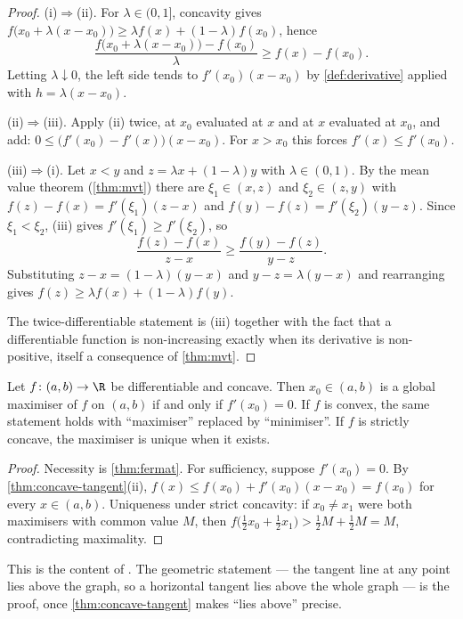 \begin{proof}
	(i)$\Rightarrow$(ii). For $\lambda\in(0,1]$, concavity gives
	$f\bigl(x_0+\lambda(x-x_0)\bigr)\geq\lambda f(x)+(1-\lambda)f(x_0)$, hence
	\[
		\frac{f\bigl(x_0+\lambda(x-x_0)\bigr)-f(x_0)}{\lambda}\geq f(x)-f(x_0).
	\]
	Letting $\lambda\downarrow0$, the left side tends to $f'(x_0)(x-x_0)$ by
	\autoref{def:derivative} applied with $h=\lambda(x-x_0)$.

	(ii)$\Rightarrow$(iii). Apply (ii) twice, at $x_0$ evaluated at $x$ and at $x$
	evaluated at $x_0$, and add:
	$0\leq\bigl(f'(x_0)-f'(x)\bigr)(x-x_0)$. For $x>x_0$ this forces
	$f'(x)\leq f'(x_0)$.

	(iii)$\Rightarrow$(i). Let $x<y$ and $z=\lambda x+(1-\lambda)y$ with
	$\lambda\in(0,1)$. By the mean value theorem (\autoref{thm:mvt}) there are
	$\xi_1\in(x,z)$ and $\xi_2\in(z,y)$ with
	$f(z)-f(x)=f'(\xi_1)(z-x)$ and $f(y)-f(z)=f'(\xi_2)(y-z)$. Since
	$\xi_1<\xi_2$, (iii) gives $f'(\xi_1)\geq f'(\xi_2)$, so
	\[
		\frac{f(z)-f(x)}{z-x}\geq\frac{f(y)-f(z)}{y-z} .
	\]
	Substituting $z-x=(1-\lambda)(y-x)$ and $y-z=\lambda(y-x)$ and rearranging gives
	$f(z)\geq\lambda f(x)+(1-\lambda)f(y)$.

	The twice-differentiable statement is (iii) together with the fact that a
	differentiable function is non-increasing exactly when its derivative is
	non-positive, itself a consequence of \autoref{thm:mvt}.
\end{proof}

\begin{theorem}
	\label{thm:foc-concave}
	Let $f\colon(a,b)\to\R$ be differentiable and concave. Then $x_0\in(a,b)$ is a
	global maximiser of $f$ on $(a,b)$ if and only if $f'(x_0)=0$. If $f$ is
	convex, the same statement holds with ``maximiser'' replaced by ``minimiser''.
	If $f$ is strictly concave, the maximiser is unique when it exists.
\end{theorem}

\begin{proof}
	Necessity is \autoref{thm:fermat}. For sufficiency, suppose $f'(x_0)=0$. By
	\autoref{thm:concave-tangent}(ii), $f(x)\leq f(x_0)+f'(x_0)(x-x_0)=f(x_0)$ for
	every $x\in(a,b)$. Uniqueness under strict concavity: if $x_0\neq x_1$ were both
	maximisers with common value $M$, then
	$f\bigl(\tfrac12x_0+\tfrac12x_1\bigr)>\tfrac12M+\tfrac12M=M$, contradicting
	maximality.
\end{proof}

This is the content of \autocite[slides 7--8]{fukuda2026calculus}. The geometric
statement --- the tangent line at any point lies above the graph, so a horizontal
tangent lies above the whole graph --- is the proof, once
\autoref{thm:concave-tangent} makes ``lies above'' precise.

